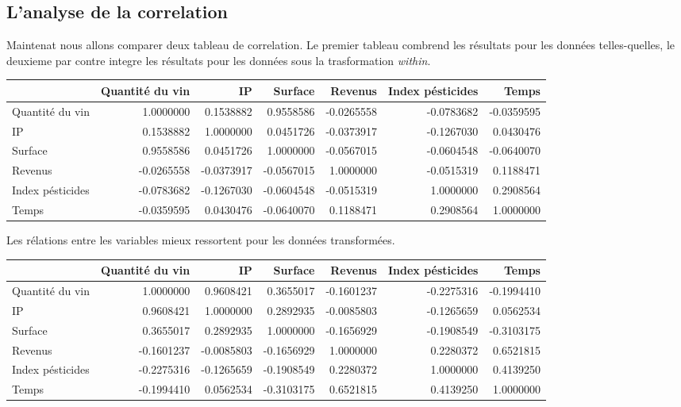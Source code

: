 \documentclass[11pt,]{article}
\begin{document}
\FloatBarrier

\hypertarget{lanalyse-de-la-correlation}{%
\subsection{L'analyse de la
correlation}\label{lanalyse-de-la-correlation}}

Maintenat nous allons comparer deux tableau de correlation. Le premier
tableau combrend les résultats pour les données telles-quelles, le
deuxieme par contre integre les résultats pour les données sous la
trasformation \emph{within}.

\FloatBarrier

\begin{longtable}[]{@{}lrrrrrr@{}}
\toprule
& Quantité du vin & IP & Surface & Revenus & Index pésticides &
Temps\tabularnewline
\midrule
\endhead
Quantité du vin & 1.0000000 & 0.1538882 & 0.9558586 & -0.0265558 &
-0.0783682 & -0.0359595\tabularnewline
IP & 0.1538882 & 1.0000000 & 0.0451726 & -0.0373917 & -0.1267030 &
0.0430476\tabularnewline
Surface & 0.9558586 & 0.0451726 & 1.0000000 & -0.0567015 & -0.0604548 &
-0.0640070\tabularnewline
Revenus & -0.0265558 & -0.0373917 & -0.0567015 & 1.0000000 & -0.0515319
& 0.1188471\tabularnewline
Index pésticides & -0.0783682 & -0.1267030 & -0.0604548 & -0.0515319 &
1.0000000 & 0.2908564\tabularnewline
Temps & -0.0359595 & 0.0430476 & -0.0640070 & 0.1188471 & 0.2908564 &
1.0000000\tabularnewline
\bottomrule
\end{longtable}

\FloatBarrier

Les rélations entre les variables mieux ressortent pour les données
transformées.

\FloatBarrier

\begin{longtable}[]{@{}lrrrrrr@{}}
\toprule
& Quantité du vin & IP & Surface & Revenus & Index pésticides &
Temps\tabularnewline
\midrule
\endhead
Quantité du vin & 1.0000000 & 0.9608421 & 0.3655017 & -0.1601237 &
-0.2275316 & -0.1994410\tabularnewline
IP & 0.9608421 & 1.0000000 & 0.2892935 & -0.0085803 & -0.1265659 &
0.0562534\tabularnewline
Surface & 0.3655017 & 0.2892935 & 1.0000000 & -0.1656929 & -0.1908549 &
-0.3103175\tabularnewline
Revenus & -0.1601237 & -0.0085803 & -0.1656929 & 1.0000000 & 0.2280372 &
0.6521815\tabularnewline
Index pésticides & -0.2275316 & -0.1265659 & -0.1908549 & 0.2280372 &
1.0000000 & 0.4139250\tabularnewline
Temps & -0.1994410 & 0.0562534 & -0.3103175 & 0.6521815 & 0.4139250 &
1.0000000\tabularnewline
\bottomrule
\end{longtable}
\end{document}
